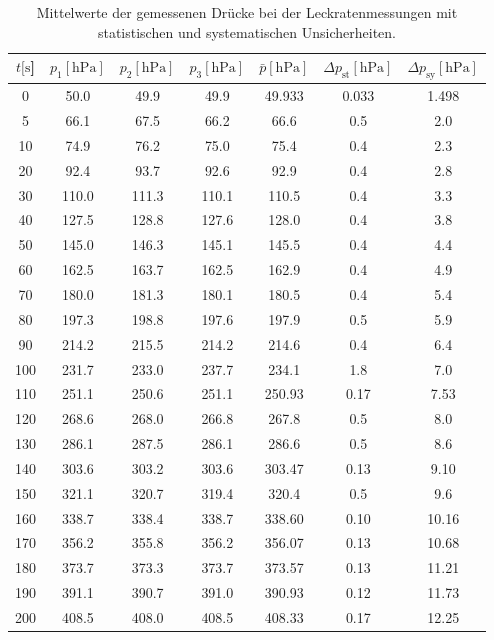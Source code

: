 %
\begin{table}[H]
  \centering
    \caption{Mittelwerte der gemessenen Drücke bei der Leckratenmessungen mit statistischen und systematischen Unsicherheiten.}
    \label{tab:Dreh_Leck3}
    \begin{tabular}{
      S[table-format=3.0] 
      S[table-format=3.1] S[table-format=3.1] S[table-format=3.1]
      S[table-format=3.2] S[table-format=1.2] S[table-format=2.1]
      }
      \toprule
      {$t [\si{\second}$]} &
      {$p_1 [\si{\hecto\pascal}]$} & {$p_2 [\si{\hecto\pascal}]$} & {$p_3 [\si{\hecto\pascal}]$} &
      {$\bar{p} [\si{\hecto\pascal}]$} & {$\Delta p_\text{st} [\si{\hecto\pascal}]$} & {$\Delta p_\text{sy} [\si{\hecto\pascal}]$}\\
          & 50.0  & 49.9  & 49.9  & 49.933 & 0.033 & 1.498 \\
      5    & 66.1  & 67.5  & 66.2  & 66.6   & 0.5   & 2.0   \\
      10   & 74.9  & 76.2  & 75.0  & 75.4   & 0.4   & 2.3   \\
      20   & 92.4  & 93.7  & 92.6  & 92.9   & 0.4   & 2.8   \\
      30   & 110.0 & 111.3 & 110.1 & 110.5  & 0.4   & 3.3   \\
      40   & 127.5 & 128.8 & 127.6 & 128.0  & 0.4   & 3.8   \\
      50   & 145.0 & 146.3 & 145.1 & 145.5  & 0.4   & 4.4   \\
      60   & 162.5 & 163.7 & 162.5 & 162.9  & 0.4   & 4.9   \\
      70   & 180.0 & 181.3 & 180.1 & 180.5  & 0.4   & 5.4   \\
      80   & 197.3 & 198.8 & 197.6 & 197.9  & 0.5   & 5.9   \\
      90   & 214.2 & 215.5 & 214.2 & 214.6  & 0.4   & 6.4   \\
      100  & 231.7 & 233.0 & 237.7 & 234.1  & 1.8   & 7.0   \\
      110  & 251.1 & 250.6 & 251.1 & 250.93 & 0.17  & 7.53  \\
      120  & 268.6 & 268.0 & 266.8 & 267.8  & 0.5   & 8.0   \\
      130  & 286.1 & 287.5 & 286.1 & 286.6  & 0.5   & 8.6   \\
      140  & 303.6 & 303.2 & 303.6 & 303.47 & 0.13  & 9.10  \\
      150  & 321.1 & 320.7 & 319.4 & 320.4  & 0.5   & 9.6   \\
      160  & 338.7 & 338.4 & 338.7 & 338.60 & 0.10  & 10.16 \\
      170  & 356.2 & 355.8 & 356.2 & 356.07 & 0.13  & 10.68 \\
      180  & 373.7 & 373.3 & 373.7 & 373.57 & 0.13  & 11.21 \\
      190  & 391.1 & 390.7 & 391.0 & 390.93 & 0.12  & 11.73 \\
      200  & 408.5 & 408.0 & 408.5 & 408.33 & 0.17  & 12.25 \\
      \bottomrule
    \end{tabular}
\end{table}
